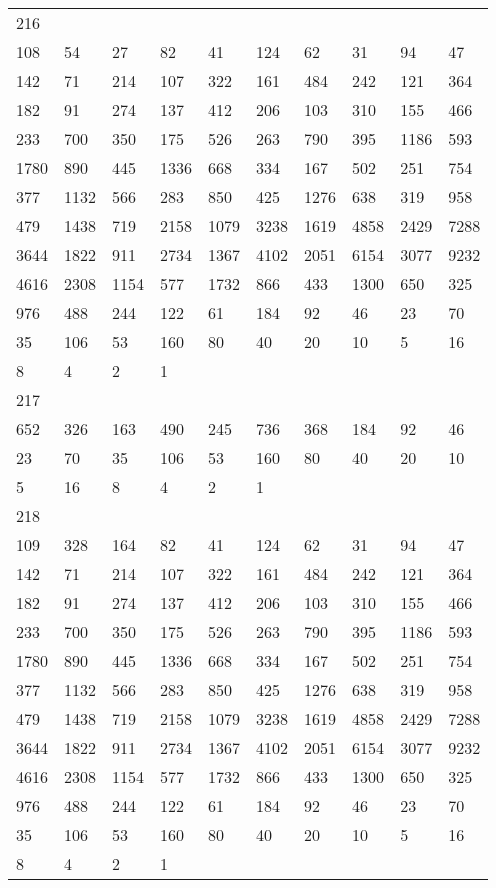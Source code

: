 \begin{longtable}{*{10}{l}}
216&&&&&&&&&\\
108& 54& 27& 82& 41& 124& 62& 31& 94& 47\\
142& 71& 214& 107& 322& 161& 484& 242& 121& 364\\
182& 91& 274& 137& 412& 206& 103& 310& 155& 466\\
233& 700& 350& 175& 526& 263& 790& 395& 1186& 593\\
1780& 890& 445& 1336& 668& 334& 167& 502& 251& 754\\
377& 1132& 566& 283& 850& 425& 1276& 638& 319& 958\\
479& 1438& 719& 2158& 1079& 3238& 1619& 4858& 2429& 7288\\
3644& 1822& 911& 2734& 1367& 4102& 2051& 6154& 3077& 9232\\
4616& 2308& 1154& 577& 1732& 866& 433& 1300& 650& 325\\
976& 488& 244& 122& 61& 184& 92& 46& 23& 70\\
35& 106& 53& 160& 80& 40& 20& 10& 5& 16\\
8& 4& 2& 1& \\

217&&&&&&&&&\\
652& 326& 163& 490& 245& 736& 368& 184& 92& 46\\
23& 70& 35& 106& 53& 160& 80& 40& 20& 10\\
5& 16& 8& 4& 2& 1& \\

218&&&&&&&&&\\
109& 328& 164& 82& 41& 124& 62& 31& 94& 47\\
142& 71& 214& 107& 322& 161& 484& 242& 121& 364\\
182& 91& 274& 137& 412& 206& 103& 310& 155& 466\\
233& 700& 350& 175& 526& 263& 790& 395& 1186& 593\\
1780& 890& 445& 1336& 668& 334& 167& 502& 251& 754\\
377& 1132& 566& 283& 850& 425& 1276& 638& 319& 958\\
479& 1438& 719& 2158& 1079& 3238& 1619& 4858& 2429& 7288\\
3644& 1822& 911& 2734& 1367& 4102& 2051& 6154& 3077& 9232\\
4616& 2308& 1154& 577& 1732& 866& 433& 1300& 650& 325\\
976& 488& 244& 122& 61& 184& 92& 46& 23& 70\\
35& 106& 53& 160& 80& 40& 20& 10& 5& 16\\
8& 4& 2& 1& \\


\end{longtable}
